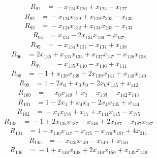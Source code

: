\begin{align*}
R_{91}&={}-x_{124}x_{126} +x_{125} -x_{127}
\end{align*}
\begin{align*}
R_{92}&={}-x_{124}x_{129} +x_{128}x_{203} -x_{130}
\end{align*}
\begin{align*}
R_{93}&={}-x_{124}x_{132} +x_{131}x_{203} -x_{133}
\end{align*}
\begin{align*}
R_{94}&={}x_{134} -2x_{134}x_{136} +x_{137}
\end{align*}
\begin{align*}
R_{95}&={}-x_{134}x_{137} -x_{137} +x_{138}
\end{align*}
\begin{align*}
R_{96}&={}2x_{135} +x_{135}x_{135} +x_{137}x_{137} -x_{138}x_{138}
\end{align*}
\begin{align*}
R_{97}&={}-x_{135}x_{140} -x_{140} +x_{141}
\end{align*}
\begin{align*}
R_{98}&={}-1 +x_{139}x_{139} +2x_{139}x_{141} +x_{140}x_{140}
\end{align*}
\begin{align*}
R_{99}&={}1 -2x_{0} +x_{0}x_{0} -2x_{0}x_{135} +x_{142}
\end{align*}
\begin{align*}
R_{100}&={}-x_{0}x_{140} +x_{3} -x_{139} +x_{142}x_{143}
\end{align*}
\begin{align*}
R_{101}&={}1 -2x_{4} +x_{4}x_{4} -2x_{4}x_{135} +x_{144}
\end{align*}
\begin{align*}
R_{102}&={}-x_{4}x_{176} +x_{17} +x_{144}x_{145} -x_{175}
\end{align*}
\begin{align*}
R_{103}&={}-1 +2x_{135}x_{187} -x_{146} +2x_{187} -x_{187}x_{187}
\end{align*}
\begin{align*}
R_{104}&={}1 +x_{146}x_{147} -x_{175} -x_{176}x_{187} +4x_{211}
\end{align*}
\begin{align*}
R_{105}&={}-x_{135}x_{149} -x_{149} +x_{150}
\end{align*}
\begin{align*}
R_{106}&={}-1 +x_{148}x_{148} +2x_{148}x_{150} +x_{149}x_{149}
\end{align*}
